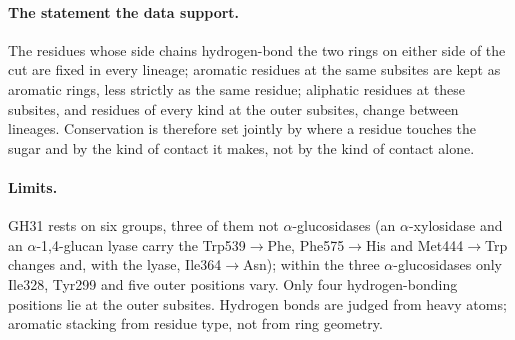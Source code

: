 \paragraph{The statement the data support.} The residues whose side chains hydrogen-bond the two
rings on either side of the cut are fixed in every lineage; aromatic residues at the same
subsites are kept as aromatic rings, less strictly as the same residue; aliphatic residues at
these subsites, and residues of every kind at the outer subsites, change between lineages.
Conservation is therefore set jointly by where a residue touches the sugar and by the kind of
contact it makes, not by the kind of contact alone.

\paragraph{Limits.} GH31 rests on six groups, three of them not $\alpha$-glucosidases (an
$\alpha$-xylosidase and an $\alpha$-1,4-glucan lyase carry the Trp539$\to$Phe, Phe575$\to$His
and Met444$\to$Trp changes and, with the lyase, Ile364$\to$Asn); within the three
$\alpha$-glucosidases only Ile328, Tyr299 and five outer positions vary. Only four
hydrogen-bonding positions lie at the outer subsites. Hydrogen bonds are judged from heavy
atoms; aromatic stacking from residue type, not from ring geometry.
